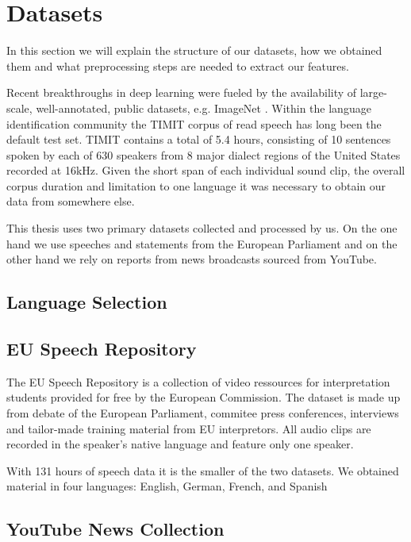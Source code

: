 \section{Datasets}
	In this section we will explain the structure of our datasets, how we obtained them and what preprocessing steps are needed to extract our features.

	Recent breakthroughs in deep learning were fueled by the availability of large-scale, well-annotated, public datasets, e.g. ImageNet \cite{ILSVRC15}. Within the language identification community the TIMIT corpus of read speech \cite{garofolo1993darpa} has long been the default test set. TIMIT contains a total of 5.4 hours, consisting of 10 sentences spoken by each of 630 speakers from 8 major dialect regions of the United States recorded at 16kHz. Given the short span of each individual sound clip, the overall corpus duration and limitation to one language it was necessary to obtain our data from somewhere else. 
  
  	This thesis uses two primary datasets collected and processed by us. On the one hand we use speeches and statements from the European Parliament and on the other hand we rely on reports from news broadcasts sourced from YouTube.

\subsection{Language Selection}  

\subsection{EU Speech Repository}

	The EU Speech Repository is a collection of video ressources for interpretation students provided for free by the European Commission. The dataset is made up from debate of the European Parliament, commitee press conferences, interviews and tailor-made training material from EU interpretors. All audio clips are recorded in the speaker's native language and feature only one speaker.
	
		With 131 hours of speech data it is the smaller of the two datasets. We obtained material in four languages: English, German, French, and Spanish

\subsection{YouTube News Collection}


